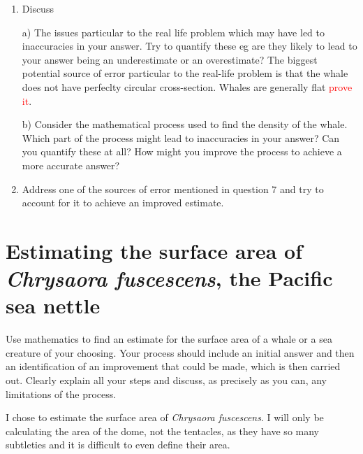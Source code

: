 \documentclass[fleqn]{article}
\newcommand\todo[1]{\textcolor{red}{#1}}
\newcommand\chry{\textit{Chrysaora fuscescens}}
\begin{document}
\begin{enumerate}
  \item	Discuss 

  a) The issues particular to the real life problem which may have led to inaccuracies in your answer.  Try to quantify these eg are they likely to lead to your answer being an underestimate or an overestimate?
  The biggest potential source of error particular to the real-life problem is that the whale does not have perfeclty circular cross-section. Whales are generally flat \todo{prove it}.

  b) Consider the mathematical process used to find the density of the whale.  Which part of the process might lead to inaccuracies in your answer?  Can you quantify these at all?  How might you improve the process to achieve a more accurate answer?

  \item	Address one of the sources of error mentioned in question 7 and try to account for it to achieve an improved estimate.

\end{enumerate}

\section{Estimating the surface area of \chry, the Pacific sea nettle}

Use mathematics to find an estimate for the surface area of a whale or a sea creature of your choosing. Your process should include an initial answer and then an identification of an improvement that could be made, which is then carried out. Clearly explain all your steps and discuss, as precisely as you can, any limitations of the process.

I chose to estimate the surface area of \chry. I will only be calculating the area of the dome, not the tentacles, as they have so many subtleties and it is difficult to even define their area.
\end{document}
